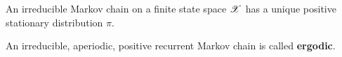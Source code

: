\documentclass[letterpaper,10pt,english]{article}
\begin{document}
\begin{cor} 
An irreducible Markov chain on a finite state space $\mathscr{X}$ has a unique positive stationary distribution $\pi$. 
\end{cor}
%
\begin{defn}
An irreducible, aperiodic, positive recurrent Markov chain is called \textbf{ergodic}. 
\end{defn}
\end{document}

